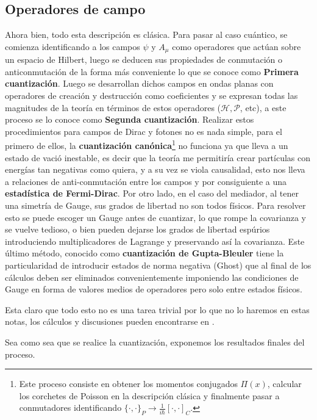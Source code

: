 \documentclass[tickz]{article}
\numberwithin{equation}{section}
\begin{document}
\subsection{Operadores de campo}\label{sec_campos}
Ahora bien, todo esta descripción es clásica. Para pasar al caso cuántico, se comienza identificando a los campos $ \psi $ y $ A_{\mu} $ como operadores que actúan sobre un espacio de Hilbert, luego se deducen sus propiedades de conmutación o anticonmutación de la forma más conveniente lo que se conoce como \textbf{Primera cuantización}. Luego se desarrollan dichos campos en ondas planas con operadores de creación y destrucción como coeficientes y se expresan todas las magnitudes de la teoría en términos de estos operadores ($ \mathscr{H},\mathscr{P} $, etc), a este proceso se lo conoce como \textbf{Segunda cuantización}. Realizar estos procedimientos para campos de Dirac y fotones no es nada simple, para el primero de ellos, la \textbf{cuantización canónica}\footnote{Este proceso consiste en obtener los momentos conjugados $ \Pi(x) $, calcular los corchetes de Poisson en la descripción clásica y finalmente pasar a conmutadores identificando $ \{\cdot,\cdot\}_{P} \rightarrow \frac{1}{i\hbar} \left[\cdot,\cdot\right]_{C}$.} no funciona ya que lleva a un estado de vació inestable, es decir que la teoría me permitiría crear partículas con energías tan negativas como quiera, y a su vez se viola causalidad, esto nos lleva a relaciones de anti-conmutación entre los campos y por consiguiente a una \textbf{estadística de Fermi-Dirac}. Por otro lado, en el caso del mediador, al tener una simetría de Gauge, sus grados de libertad no son todos físicos. Para resolver esto se puede escoger un Gauge antes de cuantizar, lo que rompe la covarianza y se vuelve tedioso, o bien pueden dejarse los grados de libertad espúrios introduciendo multiplicadores de Lagrange y preservando así la covarianza. Este último método, conocido como \textbf{cuantización de Gupta-Bleuler} tiene la particularidad de introducir estados de norma negativa (Ghost) que al final de los cálculos deben ser eliminados convenientemente imponiendo las condiciones de Gauge en forma de valores medios de operadores pero solo entre estados físicos.

Esta claro que todo esto no es una tarea trivial por lo que no lo haremos en estas notas, los cálculos y discusiones pueden encontrarse en \cite{Itzqui}. 

Sea como sea que se realice la cuantización, exponemos los resultados finales del proceso. 
\end{document}
